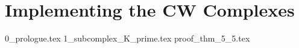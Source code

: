 \documentclass[class=article, crop=false]{standalone}
\begin{document}
\section{Implementing the CW Complexes}	

{0_prologue.tex}
{1_subcomplex_K_prime.tex}
{proof_thm_5_5.tex}
\end{document}
